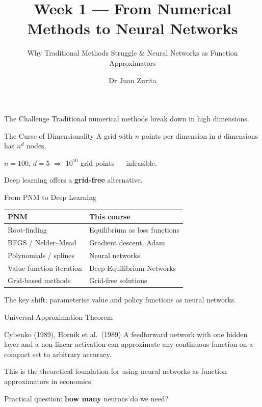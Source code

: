 \documentclass[aspectratio=169, 10pt]{beamer}
\title{Week 1 --- From Numerical Methods to Neural Networks}
\subtitle{Why Traditional Methods Struggle \& Neural Networks as Function Approximators}
\author{Dr Juan Zurita}
\institute{Deep Learning for Macroeconomics\\
The University of Edinburgh~$\cdot$~School of Economics}
\date{}
\begin{document}
\maketitle

\begin{frame}{The Challenge}
Traditional numerical methods break down in \alert{high dimensions}.

\bigskip
\begin{block}{The Curse of Dimensionality}
A grid with $n$ points per dimension in $d$ dimensions has $n^d$ nodes.

$n=100$, $d=5$ $\Rightarrow$ $10^{10}$ grid points --- infeasible.
\end{block}

\bigskip
Deep learning offers a \textbf{grid-free} alternative.
\end{frame}

\begin{frame}{From PNM to Deep Learning}
\begin{center}
\begin{tabular}{ll}
\toprule
PNM & This course \\
\midrule
Root-finding & Equilibrium as loss functions \\
BFGS / Nelder--Mead & Gradient descent, Adam \\
Polynomials / splines & Neural networks \\
Value-function iteration & Deep Equilibrium Networks \\
Grid-based methods & Grid-free solutions \\
\bottomrule
\end{tabular}
\end{center}

\bigskip
The key shift: parameterise value and policy functions as \alert{neural networks}.
\end{frame}

\begin{frame}{Universal Approximation Theorem}
\begin{block}{Cybenko (1989), Hornik et al.\ (1989)}
A feedforward network with one hidden layer and a non-linear activation can approximate any continuous function on a compact set to arbitrary accuracy.
\end{block}

\bigskip
This is the theoretical foundation for using neural networks as function approximators in economics.

\bigskip
Practical question: \textbf{how many} neurons do we need?
\end{frame}
\end{document}

